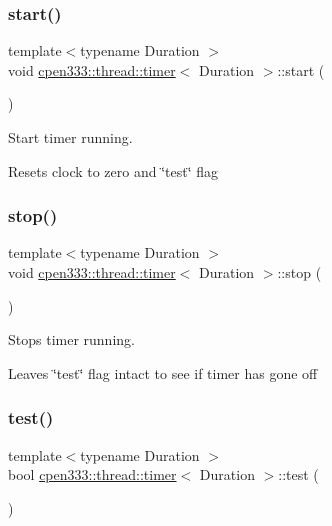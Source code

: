 \subsubsection{\texorpdfstring{start()}{start()}}
{\footnotesize\ttfamily template$<$typename Duration $>$ \\
void \hyperlink{classcpen333_1_1thread_1_1timer}{cpen333\+::thread\+::timer}$<$ Duration $>$\+::start (\begin{DoxyParamCaption}{ }\end{DoxyParamCaption})\hspace{0.3cm}{\ttfamily [inline]}}



Start timer running. 

Resets clock to zero and \char`\"{}test\char`\"{} flag \mbox{\label{classcpen333_1_1thread_1_1timer_afa3811e04ef58d3040935c49aca19948}} 
\subsubsection{\texorpdfstring{stop()}{stop()}}
{\footnotesize\ttfamily template$<$typename Duration $>$ \\
void \hyperlink{classcpen333_1_1thread_1_1timer}{cpen333\+::thread\+::timer}$<$ Duration $>$\+::stop (\begin{DoxyParamCaption}{ }\end{DoxyParamCaption})\hspace{0.3cm}{\ttfamily [inline]}}



Stops timer running. 

Leaves \char`\"{}test\char`\"{} flag intact to see if timer has gone off \mbox{\label{classcpen333_1_1thread_1_1timer_af81a4656b66d8bebd7497ffe826f4373}} 
\subsubsection{\texorpdfstring{test()}{test()}}
{\footnotesize\ttfamily template$<$typename Duration $>$ \\
bool \hyperlink{classcpen333_1_1thread_1_1timer}{cpen333\+::thread\+::timer}$<$ Duration $>$\+::test (\begin{DoxyParamCaption}{ }\end{DoxyParamCaption})\hspace{0.3cm}{\ttfamily [inline]}}



